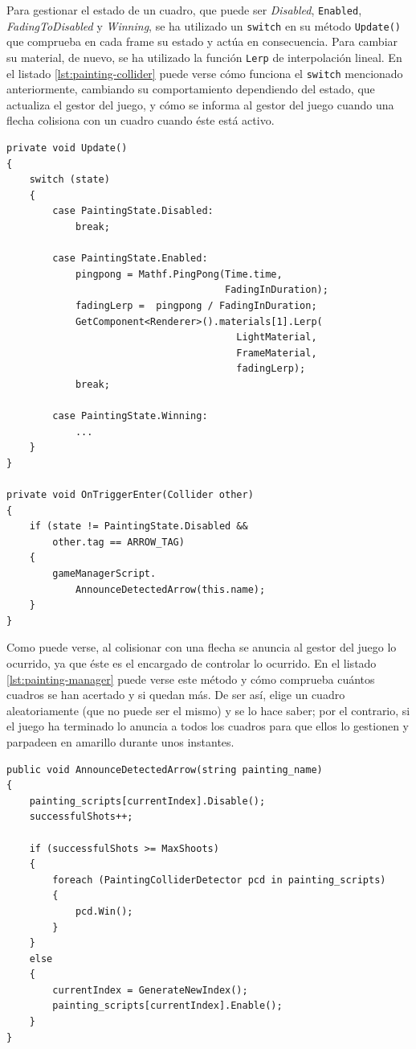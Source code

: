 Para gestionar el estado de un cuadro, que puede ser \textit{Disabled}, \texttt{Enabled}, \textit{FadingToDisabled} y \textit{Winning}, se ha utilizado un \texttt{switch} en su método \texttt{Update()} que comprueba en cada frame su estado y actúa en consecuencia. Para cambiar su material, de nuevo, se ha utilizado la función \texttt{Lerp} de interpolación lineal. 
En el listado \ref{lst:painting-collider} puede verse cómo funciona el \texttt{switch} mencionado anteriormente, cambiando su comportamiento dependiendo del estado, que actualiza el gestor del juego, y cómo se informa al gestor del juego cuando una flecha colisiona con un cuadro cuando éste está activo.

\newpage

\begin{lstlisting}[caption=Fragmento del script para actualizar un cuadro, label=lst:painting-collider]
private void Update()
{
    switch (state)
    {
        case PaintingState.Disabled:
            break;
        
        case PaintingState.Enabled:
            pingpong = Mathf.PingPong(Time.time, 
                                      FadingInDuration);
            fadingLerp =  pingpong / FadingInDuration;
            GetComponent<Renderer>().materials[1].Lerp(
                                        LightMaterial,
                                        FrameMaterial,
                                        fadingLerp);
            break;
    
        case PaintingState.Winning:
            ...
    }
}

private void OnTriggerEnter(Collider other)
{
    if (state != PaintingState.Disabled && 
        other.tag == ARROW_TAG)
    {
        gameManagerScript.
            AnnounceDetectedArrow(this.name);
    }
}
\end{lstlisting}

Como puede verse, al colisionar con una flecha se anuncia al gestor del juego lo ocurrido, ya que éste es el encargado de controlar lo ocurrido. En el listado \ref{lst:painting-manager} puede verse este método y cómo comprueba cuántos cuadros se han acertado y si quedan más. De ser así, elige un cuadro aleatoriamente (que no puede ser el mismo) y se lo hace saber; por el contrario, si el juego ha terminado lo anuncia a todos los cuadros para que ellos lo gestionen y parpadeen en amarillo durante unos instantes.

\begin{lstlisting}[caption=Fragmento del script para gestionar el juego del arco, label=lst:painting-manager]
public void AnnounceDetectedArrow(string painting_name)
{
    painting_scripts[currentIndex].Disable();
    successfulShots++;

    if (successfulShots >= MaxShoots)
    {
        foreach (PaintingColliderDetector pcd in painting_scripts)
        {
            pcd.Win();
        }
    }
    else
    {
        currentIndex = GenerateNewIndex();
        painting_scripts[currentIndex].Enable();
    }
}
\end{lstlisting}


